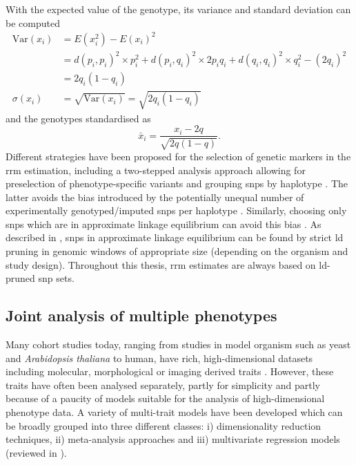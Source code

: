 %
With the expected value of the genotype, its variance and standard deviation can be computed
\begin{align}
\text{Var}(x_i) &= E(x_i^2) - E(x_i)^2 \\
&= d(p_i,p_i)^2 \times  p_i^2 + d(p_i,q_i)^2  \times 2p_iq_i + d(q_i,q_i)^2  \times q_i^2 - (2q_i)^2 \\
&=  2q_i(1-q_i) \\
\sigma(x_i) &= \sqrt{\text{Var}(x_i)} = \sqrt{2q_i(1-q_i)}
\end{align}
%
and the genotypes standardised as
\begin{equation}
\bar{x}_i = \frac{x_i - 2q}{\sqrt{2q(1-q)}}.
\end{equation}
%
Different strategies have been proposed for the selection of genetic markers in the \gls{rrm} estimation, including a two-stepped analysis approach allowing for preselection of phenotype-specific variants \citep{Lippert2013} and grouping \glspl{snp} by haplotype \citep{Zhao2007,Kang2008}. The latter avoids the bias introduced by the potentially unequal number of experimentally genotyped/imputed \glspl{snp} per haplotype \citep{Speed2017}. Similarly, choosing only \glspl{snp} which are in approximate linkage equilibrium can avoid this bias \citep{Browning2008}. As described in \citep{Eu-ahsunthornwattana2014}, \glspl{snp} in approximate linkage equilibrium can be found by strict \gls{ld} pruning in genomic windows of appropriate size (depending on the organism and study design). Throughout this thesis, \gls{rrm} estimates are always based on \gls{ld}-pruned \gls{snp} sets.  

\subsection{Joint analysis of multiple phenotypes}
\label{subsection:joint-analysis}
Many cohort studies today, ranging from studies in model organism such as yeast and \textit{Arabidopsis thaliana} to human, have rich, high-dimensional datasets including molecular, morphological or imaging derived traits \citep{Bloom2013,Atwell2010,Astle2009,Shaffer2016,Stein2010}. However, these traits have often been analysed separately,  partly for simplicity and partly because of a paucity of models suitable for the analysis of high-dimensional phenotype data. A variety of multi-trait models have been developed which can be broadly grouped into three different classes: i) dimensionality reduction techniques, ii) meta-analysis approaches and iii) multivariate regression models (reviewed in \citep{Shriner2012,Yang2012b}). 

